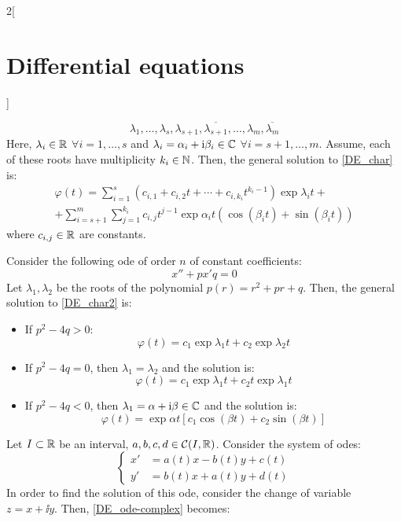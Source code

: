 \documentclass[../../../main_math.tex]{subfiles}
\begin{document}
\begin{multicols}{2}[\section{Differential equations}]
\begin{method}
    $$\lambda_1,\ldots,\lambda_s,\lambda_{s+1},\overline{\lambda_{s+1}},\ldots,\lambda_{m},\overline{\lambda_m}$$
    Here, $\lambda_i\in\mathbb{R}$ $\forall i=1,\ldots,s$ and $\lambda_{i}=\alpha_i+\mathrm{i}\beta_i\in\mathbb{C}$ $\forall i=s+1,\ldots,m$. Assume, each of these roots have multiplicity $k_i\in\mathbb{N}$. Then, the general solution to \cref{DE_char} is:
    \begin{multline*}
      \varphi(t)=\sum_{i=1}^s\left(c_{i,1}+c_{i,2}t+\cdots+c_{i,k_i}t^{k_i-1}\right)\exp{\lambda_i t}+\\
      +\sum_{i=s+1}^m\sum_{j=1}^{k_i}c_{i,j}t^{j-1}\exp{\alpha_i t}\left(\cos(\beta_i t)+\sin(\beta_i t)\right)
    \end{multline*}
    where $c_{i,j}\in\mathbb{R}$ are constants.
  \end{method}
  \begin{corollary}
    Consider the following ode of order $n$ of constant coefficients:
    \begin{equation}\label{DE_char2}
      x'' + px' q = 0
    \end{equation}
    Let $\lambda_1,\lambda_2$ be the roots of the polynomial $p(r)=r^2+pr+q$.
    Then, the general solution to \cref{DE_char2} is:
    \begin{itemize}
      \item If $p^2-4q>0$: $$\varphi(t)=c_1\exp{\lambda_1t}+c_2\exp{\lambda_2t}$$
      \item If $p^2-4q=0$, then $\lambda_1=\lambda_2$ and the solution is: $$\varphi(t)=c_1\exp{\lambda_1t}+c_2t\exp{\lambda_1t}$$
      \item If $p^2-4q<0$, then $\lambda_1=\alpha+\mathrm{i}\beta\in\mathbb{C}$ and the solution is: $$\varphi(t)=\exp{\alpha t}\left[c_1\cos(\beta t)+c_2\sin(\beta t)\right]$$
    \end{itemize}
  \end{corollary}
  \begin{method}
    Let $I\subset \mathbb{R}$ be an interval, $a,b,c,d\in\mathcal{C}(I,\mathbb{R})$. Consider the system of odes:
    \begin{equation}\label{DE_ode-complex}
      \left\{
      \begin{aligned}
        x' & =a(t)x-b(t)y+c(t) \\
        y' & =b(t)x+a(t)y+d(t)
      \end{aligned}
      \right.
    \end{equation}
    In order to find the solution of this ode, consider the change of variable $z=x+\ii y$. Then, \cref{DE_ode-complex} becomes:

\end{method}
\end{multicols}
\end{document}
